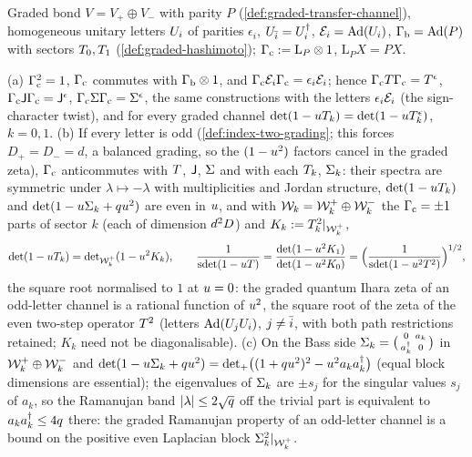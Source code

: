 Graded bond $V = V_+\oplus V_-$ with parity $P$ (\cref{def:graded-transfer-channel}), homogeneous unitary
letters $U_{i}$ of parities $\epsilon_i$, $U_{\bar{i}} = U_{i}^\dagger$, $\mathcal E_{i} = \operatorname{Ad}(U_{i})$, $\Gamma_{\mathrm b} = \operatorname{Ad}(P)$
with sectors $T_0,T_1$ (\cref{def:graded-hashimoto}); $\Gamma_{\mathrm c} := \mathrm L_P\otimes1$, $\mathrm L_PX = PX$.

\begin{theorem}
\label{thm:odd-letters-chiral}
(a) $\Gamma_{\mathrm c}^2 = 1$, $\Gamma_{\mathrm c}$ commutes with $\Gamma_{\mathrm b}\otimes1$, and $\Gamma_{\mathrm c}\mathcal E_{i}\Gamma_{\mathrm c} = \epsilon_i\mathcal E_{i}$; hence
$\Gamma_{\mathrm c}T\Gamma_{\mathrm c} = T^{\epsilon}$, $\Gamma_{\mathrm c}\mathsf J\Gamma_{\mathrm c} = \mathsf J^{\epsilon}$, $\Gamma_{\mathrm c}\Sigma\Gamma_{\mathrm c} = \Sigma^{\epsilon}$,
the same constructions with the letters $\epsilon_i\mathcal E_{i}$ (the sign-character twist), and for every
graded channel $\det(1-uT_k) = \det(1-uT_k^{\epsilon})$, $k = 0,1$.
(b) If every letter is odd (\cref{def:index-two-grading}; this forces $D_+ = D_- = d$, a balanced grading,
so the $(1-u^2)$ factors cancel in the graded zeta), $\Gamma_{\mathrm c}$ anticommutes with $T$, $\mathsf J$, $\Sigma$ and
with each $T_k$, $\Sigma_k$: their spectra are symmetric under $\lambda\mapsto-\lambda$ with multiplicities
and Jordan structure, $\det(1-uT_k)$ and $\det(1-u\Sigma_k+qu^2)$ are even in $u$, and with
$\mathcal W_k = \mathcal W_k^+\oplus\mathcal W_k^-$ the $\Gamma_{\mathrm c} = \pm1$ parts of sector $k$ (each of dimension $d^2D$) and
$K_k := T_k^2|_{\mathcal W_k^+}$,
\[
  \det(1-uT_k) = \det\nolimits_{\mathcal W_k^+}(1-u^2K_k),\qquad
  \frac1{\operatorname{sdet}(1-uT)} = \frac{\det(1-u^2K_1)}{\det(1-u^2K_0)} = \Bigl(\frac1{\operatorname{sdet}(1-u^2T^2)}\Bigr)^{1/2},
\]
the square root normalised to $1$ at $u = 0$: the graded quantum Ihara zeta of an odd-letter channel is a
rational function of $u^2$, the square root of the zeta of the even two-step operator $T^2$ (letters
$\operatorname{Ad}(U_{j}U_{i})$, $j\ne\bar{i}$, with both path restrictions retained; $K_k$ need not be diagonalisable).
(c) On the Bass side $\Sigma_k = \bigl(\begin{smallmatrix}0 & a_k\\ a_k^\dagger & 0\end{smallmatrix}\bigr)$ in
$\mathcal W_k^+\oplus\mathcal W_k^-$ and $\det(1-u\Sigma_k+qu^2) = \det_{+}\bigl((1+qu^2)^2-u^2a_ka_k^\dagger\bigr)$
(equal block dimensions are essential); the eigenvalues of $\Sigma_k$ are $\pm s_j$ for the singular values
$s_j$ of $a_k$, so the Ramanujan band $|\lambda|\le2\sqrt{q}$ off the trivial part is equivalent to
$a_ka_k^\dagger\le4q$ there: the graded Ramanujan property of an odd-letter channel is a bound on the
positive even Laplacian block $\Sigma_k^2|_{\mathcal W_k^+}$.
\end{theorem}

